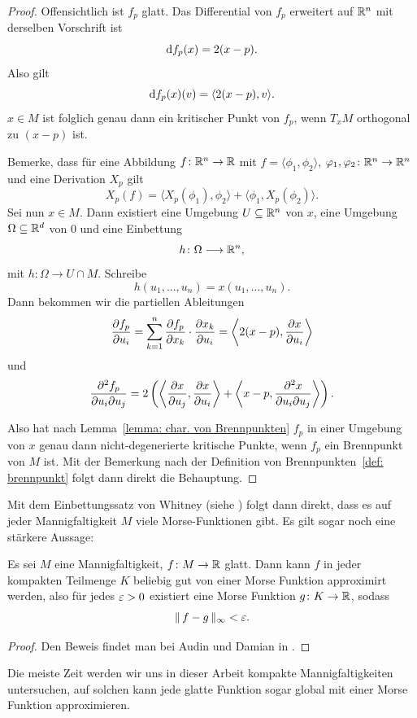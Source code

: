 \begin{proof}
    Offensichtlich ist $f_p$ glatt. Das Differential von $f_p$ erweitert auf ${ \mathbb R }^n$ mit 
    derselben Vorschrift ist
    \[ { \operatorname{d} } f_p (x) = 2 (x - p). \]
    Also gilt
    \[ { \operatorname{d} } f_p (x) (v) = \langle 2 (x - p), v \rangle . \]
    $x \in M$ ist folglich genau dann ein kritischer Punkt von $f_p$, wenn $T_xM$ orthogonal 
    zu $(x - p)$ ist.

    Bemerke, dass für eine Abbildung $f \colon { \mathbb R }^n \to { \mathbb R }$ mit $f = \langle \phi_1, \phi_2 \rangle$,
    $\varphi_1, \varphi_2 \colon { \mathbb R }^n \to { \mathbb R }^n$ und eine Derivation $X_p$ gilt 
    \[ X_p (f) = \langle X_p(\phi_1), \phi_2 \rangle + \langle \phi_1, X_p(\phi_2) \rangle.  \]
    Sei nun $x \in M$. Dann existiert eine Umgebung $U \subseteq { \mathbb R }^n$ von $x$, eine Umgebung 
    $\Omega \subseteq { \mathbb R }^d$ von $0$ und eine Einbettung 
    \[ h \colon \Omega \longrightarrow { \mathbb R }^n , \]
    mit $h \colon \Omega \to U \cap M$.
    Schreibe
    \[ h(u_1, ..., u_n) = x(u_1, ..., u_n). \]
    Dann bekommen wir die partiellen Ableitungen
    \[ 
        \pderive[f_p]{u_i} = \sum_{k = 1}^n \pderive[f_p]{x_k} \cdot \pderive[x_k]{u_i} 
        = \left\langle 2(x - p), \pderive[x]{u_i} \right\rangle 
    \]
    und 
    \[ 
        \pdderive[f_p]{u_i}{u_j} = 
            2 \left( \left\langle \pderive[x]{u_j}, \pderive[x]{u_i} \right\rangle + 
            \left\langle x - p , \pdderive[x]{u_i}{u_j} \right\rangle \right) 
    . \]
    
    Also hat nach Lemma~\ref{lemma: char. von Brennpunkten} $f_p$ in einer Umgebung von $x$ genau 
    dann nicht-degenerierte kritische Punkte, wenn $f_p$ ein Brennpunkt von $M$ ist. Mit der 
    Bemerkung nach der Definition von Brennpunkten~\ref{def: brennpunkt} folgt dann direkt die 
    Behauptung.
\end{proof}

\begin{remark}
    Mit dem Einbettungssatz von Whitney (siehe \cite{whitney}) folgt dann direkt, dass es auf 
    jeder Mannigfaltigkeit $M$ viele Morse-Funktionen gibt. Es gilt sogar noch eine stärkere 
    Aussage:
\end{remark}

\begin{prop}
    \label{prop: morse-approximation}
    Es sei $M$ eine Mannigfaltigkeit, $f \colon M \to { \mathbb R }$ glatt. Dann kann $f$ in jeder kompakten
    Teilmenge $K$ beliebig gut von einer Morse Funktion approximirt werden, also für jedes 
    $\varepsilon > 0$ existiert eine Morse Funktion $g \colon K \to { \mathbb R }$, sodass 
    \[ \| \, f - g \, \|_{\infty} < \varepsilon . \]
\end{prop}

\begin{proof}
    Den Beweis findet man bei Audin und Damian in \cite{audin}.
\end{proof}

Die meiste Zeit werden wir uns in dieser Arbeit kompakte Mannigfaltigkeiten untersuchen,
auf solchen kann jede glatte Funktion sogar global mit einer Morse Funktion approximieren.
